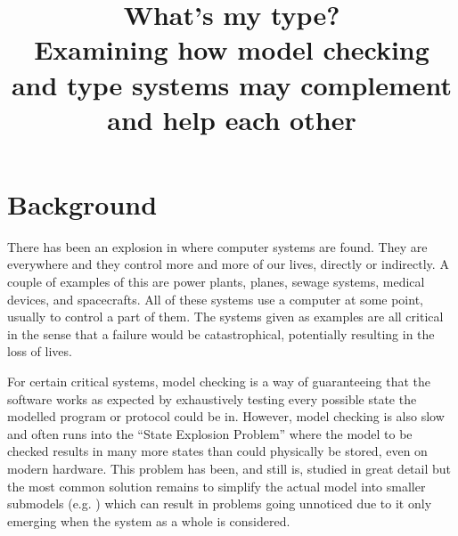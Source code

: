 \documentclass[11pt]{article}
\title{What's my type?\\Examining how model checking and type systems may
       complement and help each other}
\date{}
\begin{document}
    \maketitle

    \section*{Background}
    There has been an explosion in where computer systems are found. They are
    everywhere and they control more and more of our lives, directly or
    indirectly. A couple of examples of this are power plants, planes, sewage
    systems, medical devices, and spacecrafts. All of these systems use a
    computer at some point, usually to control a part of them. The systems
    given as examples are all critical in the sense that a failure would be
    catastrophical, potentially resulting in the loss of lives.
    
    For certain critical systems, model checking is a way of guaranteeing that
    the software works as expected by exhaustively testing every possible state
    the modelled program or protocol could be in. However, model checking is
    also slow and often runs into the ``State Explosion Problem''
    \cite{goos_state_1998} where the model to be checked results in many more
    states than could physically be stored, even on modern hardware. This
    problem has been, and still is, studied in great detail
    \cite{goos_progress_2001,stuart_simulation-verification_2001,demri_parametric_2006,clarke_model_2008,kress-gazit_correct_2011,meyer_model_2012}
    but the most common solution remains to simplify the actual model into
    smaller submodels (e.g. \cite{yan_sun_verifying_2007}) which can result in
    problems going unnoticed due to it only emerging when the system as a whole
    is considered.\\
    
\end{document}
